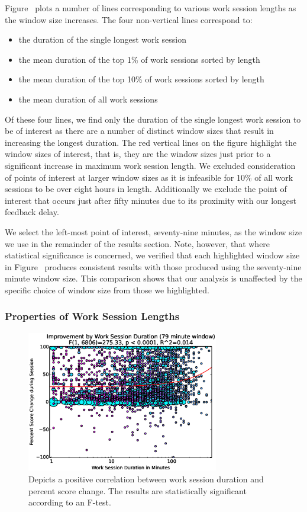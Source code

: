 Figure~ plots a number of lines corresponding to
various work session lengths as the window size increases. The four
non-vertical lines correspond to:

\begin{itemize}
\item the duration of the single longest work session
\item the mean duration of the top 1\% of work sessions sorted by length
\item the mean duration of the top 10\% of work sessions sorted by length
\item the mean duration of all work sessions
\end{itemize}

Of these four lines, we find only the duration of the single longest work
session to be of interest as there are a number of distinct window sizes that
result in increasing the longest duration. The red vertical lines on the figure
highlight the window sizes of interest, that is, they are the window sizes just
prior to a significant increase in maximum work session length. We excluded
consideration of points of interest at larger window sizes as it is infeasible
for 10\% of all work sessions to be over eight hours in length. Additionally we
exclude the point of interest that occurs just after fifty minutes due to its
proximity with our longest feedback delay.

We select the left-most point of interest, seventy-nine minutes, as the window
size we use in the remainder of the results section. Note, however, that where
statistical significance is concerned, we verified that each highlighted window
size in Figure~ produces consistent results with
those produced using the seventy-nine minute window size. This comparison shows
that our analysis is unaffected by the specific choice of window size from
those we highlighted.

\subsubsection{Properties of Work Session Lengths}

\begin{figure}[!t]
\centering \includegraphics[width=3.3in]{graphs/Improvement_by_Work_Session_Duration_(79_minute_window).eps}
\caption{Depicts a positive correlation between work session duration and
  percent score change. The results are statistically significant according to
  an F-test.}
\end{figure}


